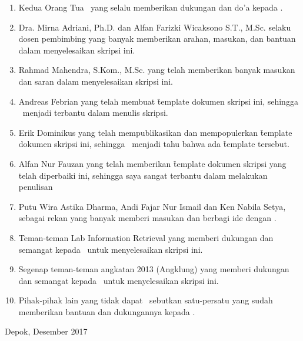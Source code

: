 \begin{enumerate}
	\item Kedua Orang Tua \saya~yang selalu memberikan dukungan dan do'a kepada \saya.
	\item Dra. Mirna Adriani, Ph.D. dan Alfan Farizki Wicaksono S.T., M.Sc. selaku dosen pembimbing yang banyak memberikan arahan, masukan, dan bantuan dalam menyelesaikan skripsi ini.
  \item Rahmad Mahendra, S.Kom., M.Sc. yang telah memberikan banyak masukan dan saran dalam menyelesaikan skripsi ini.
  \item Andreas Febrian yang telah membuat \f{template} dokumen skripsi ini, sehingga \saya~menjadi terbantu dalam menulis skripsi.
  \item Erik Dominikus yang telah mempublikasikan dan mempopulerkan \f{template} dokumen skripsi ini, sehingga \saya~menjadi tahu bahwa ada \f{template} tersebut.
  \item Alfan Nur Fauzan yang telah memberikan \f{template} dokumen skripsi yang telah diperbaiki ini, sehingga saya sangat terbantu dalam melakukan penulisan
	\item Putu Wira Astika Dharma, Andi Fajar Nur Ismail dan Ken Nabila Setya, sebagai rekan yang banyak memberi masukan dan berbagi ide dengan \saya.
  \item Teman-teman Lab Information Retrieval yang memberi dukungan dan semangat kepada \saya~untuk menyelesaikan skripsi ini.
  \item Segenap teman-teman angkatan 2013 (Angklung) yang memberi dukungan dan semangat kepada \saya~untuk menyelesaikan skripsi ini.
	\item Pihak-pihak lain yang tidak dapat \saya~sebutkan satu-persatu yang sudah memberikan bantuan dan dukungannya kepada \saya.
\end{enumerate}
\vspace*{0.1cm}
\begin{flushright}
Depok, Desember 2017\\[0.1cm]
\vspace*{1cm}
\penulis

\end{flushright}